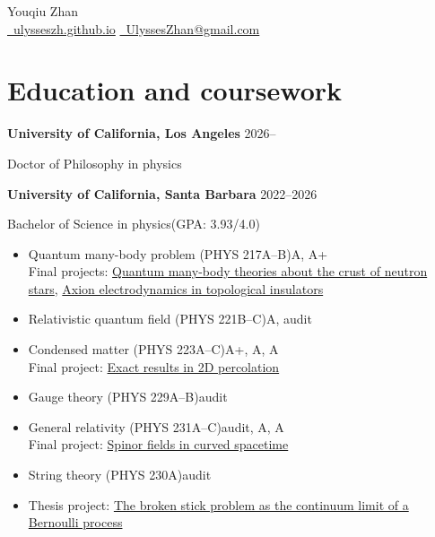 \documentclass[letterpaper,12pt]{article}
\newenvironment{job}[2]{
	\textbf{#1} \hfill #2\par\vspace{-0.5\baselineskip}
}{}
\begin{document}
\pagestyle{empty}

\begin{center}
	\Huge{Youqiu Zhan}\\
	\normalsize
	\href{https://ulysseszh.github.io}{\raisebox{-0.05\height}\faGlobe~ulysseszh.github.io}\qquad
	\href{mailto:Ulysses Zhan <UlyssesZhan@gmail.com>}{\raisebox{-0.05\height}\faEnvelope~UlyssesZhan@gmail.com}
\end{center}

\section{Education and coursework}

\begin{job}{University of California, Los Angeles}{2026--}
	Doctor of Philosophy in physics
\end{job}

\begin{job}{University of California, Santa Barbara}{2022--2026}
	Bachelor of Science in physics\hfill(GPA: 3.93/4.0)\par\vspace{-0.5\baselineskip}
	\begin{itemize}
		\item Quantum many-body problem (PHYS 217A--B)\hfill A, A+\\
		Final projects:
		\href{https://ulysseszh.github.io/coursework/crust-neutron-star.pdf}{Quantum many-body theories about the crust of neutron stars},
		\href{https://ulysseszh.github.io/coursework/axion-insulator.pdf}{Axion electrodynamics in topological insulators}
		\item Relativistic quantum field (PHYS 221B--C)\hfill A, audit
		\item Condensed matter (PHYS 223A--C)\hfill A+, A\textminus, A\\
		Final project:
		\href{https://ulysseszh.github.io/coursework/exact-2d-percolation.pdf}{Exact results in 2D percolation}
		\item Gauge theory (PHYS 229A--B)\hfill audit
		\item General relativity (PHYS 231A--C)\hfill audit, A, A\\
		Final project:
		\href{https://ulysseszh.github.io/coursework/spinor-curved.pdf}{Spinor fields in curved spacetime}
		\item String theory (PHYS 230A)\hfill audit
		\item Thesis project:
		\href{https://github.com/UlyssesZh/combo-prob/raw/build/thesis/thesis.pdf}{The broken stick problem as the continuum limit of a Bernoulli process}
	\end{itemize}
\end{job}
\end{document}
